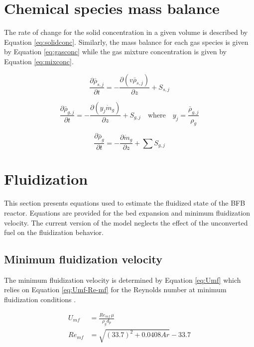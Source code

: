 \documentclass[12pt,titlepage]{article}
\begin{document}
\section{Chemical species mass balance}

The rate of change for the solid concentration in a given volume is described by Equation \ref{eq:solidconc}. Similarly, the mass balance for each gas species is given by Equation \ref{eq:gasconc} while the gas mixture concentration is given by Equation \ref{eq:mixconc}.

\begin{equation} \label{eq:solidconc}
    \frac{\partial \bar\rho_{s,j}}{\partial t} = -\frac{\partial (v \bar\rho_{s,j})}{\partial z} + S_{s,j}
\end{equation}

\begin{equation} \label{eq:gasconc}
    \frac{\partial \bar\rho_{g,j}}{\partial t} = -\frac{\partial (y_j \dot m_g)}{\partial z} + S_{g,j} \quad \text{where} \quad y_j = \frac{\bar\rho_{g,j}}{\rho_g}
\end{equation}

\begin{equation} \label{eq:mixconc}
    \frac{\partial \bar\rho_g}{\partial t} = -\frac{\partial \dot m_g}{\partial z} + \sum S_{g,j}
\end{equation}

\section{Fluidization}

This section presents equations used to estimate the fluidized state of the BFB reactor. Equations are provided for the bed expansion and minimum fluidization velocity. The current version of the model neglects the effect of the unconverted fuel on the fluidization behavior.

\subsection{Minimum fluidization velocity}

The minimum fluidization velocity is determined by Equation \ref{eq:Umf} which relies on Equation \ref{eq:Umf-Re-mf} for the Reynolds number at minimum fluidization conditions \cite{Wen-1966}.

\begin{align}
    U_{mf} &= \frac{Re_{mf}\,\mu}{\rho_g d_p} \label{eq:Umf} \\
    Re_{mf} &= \sqrt{(33.7)^2 + 0.0408 Ar} - 33.7 \label{eq:Umf-Re-mf}
\end{align}
\end{document}
